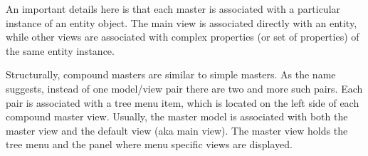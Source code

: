   An important details here is that each master is associated with a particular instance of an entity object.
  The main view is associated directly with an entity, while other views are associated with complex properties (or set of properties) of the same entity instance.
  
  Structurally, compound masters are similar to simple masters.
  As the name suggests, instead of one model/view pair there are two and more such pairs.
  Each pair is associated with a tree menu item, which is located on the left side of each compound master view.
  Usually, the master model is associated with both the master view and the default view (aka main view).
  The master view holds the tree menu and the panel where menu specific views are displayed.
  



